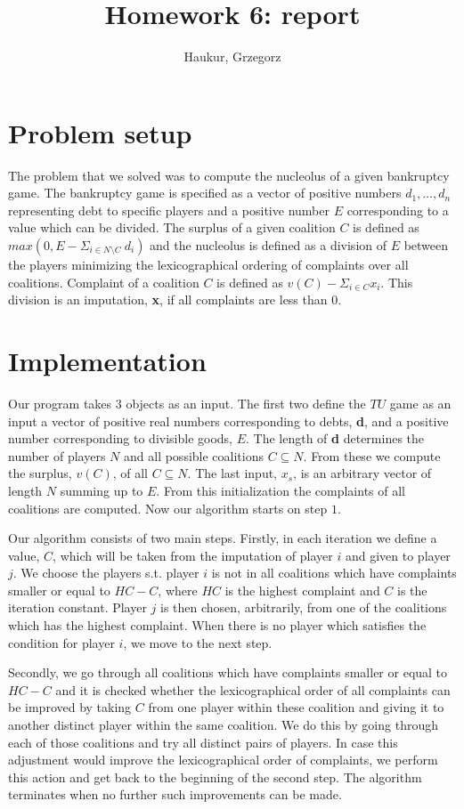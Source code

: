 \documentclass{article}
\title{Homework 6: report}
\author{Haukur, Grzegorz}
\begin{document}
\maketitle
\section{Problem setup}
The problem that we solved was to compute the nucleolus of a given bankruptcy game. The bankruptcy game is specified as a vector of positive numbers $d_1, \dots, d_n$ representing debt to specific players and a positive number $E$ corresponding to a value which can be divided. The surplus of a given coalition $C$ is defined as $max(0, E - \Sigma_{i \in N \setminus C} \ d_i)$ and the nucleolus is defined as a division of $E$ between the players minimizing the lexicographical ordering of complaints over all coalitions. Complaint of a coalition $C$ is defined as $v(C) - \Sigma_{i \in C} x_i$. This division is an imputation, \textbf{x}, if all complaints are less than $0$.

\section{Implementation}
Our program takes $3$ objects as an input. The first two define the $TU$ game as an input a vector of positive real numbers corresponding to debts, \textbf{d}, and a positive number corresponding to divisible goods, $E$. The length of \textbf{d} determines the number of players $N$ and all possible coalitions $C \subseteq N$. From these we compute the surplus, $v(C)$, of all $C \subseteq N$. The last input, \textbf{$x_s$}, is an arbitrary vector of length $N$ summing up to $E$. From this initialization the complaints of all coalitions are computed. Now our algorithm starts on step $1$.

Our algorithm consists of two main steps. Firstly, in each iteration we define a value, $C$, which will be taken from the imputation of player $i$ and given to player $j$. We choose the players s.t. player $i$ is not in all coalitions which have complaints smaller or equal to $HC - C$, where $HC$ is the highest complaint and $C$ is the iteration constant. Player $j$ is then chosen, arbitrarily, from one of the coalitions which has the highest complaint. When there is no player which satisfies the condition for player $i$, we move to the next step.

Secondly, we go through  all coalitions which have complaints smaller or equal to $HC - C$ and it is checked whether the lexicographical order of all complaints can be improved by taking $C$ from one player within these coalition and giving it to another distinct player within the same coalition. We do this by going through each of those coalitions and try all distinct pairs of players. In case this adjustment would improve the lexicographical order of complaints, we perform this action and get back to the beginning of the second step. The algorithm terminates when no further such improvements can be made.
\end{document}
